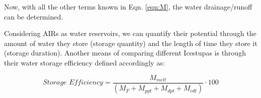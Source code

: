 \documentclass[utf8]{frontiersSCNS} %
\begin{document}
Now, with all the other terms known in Eqn. \ref{eqn:M}, the water drainage/runoff can be determined. 

Considering AIRs as water reservoirs, we can quantify their potential through the amount of water they store (storage
quantity) and the length of time they store it (storage duration). Another means of comparing different Icestupas is
through their water storage efficiency defined accordingly as:

\begin{equation} \textit{Storage Efficiency} = \frac{M_{melt}}{(M_F+M_{ppt}+M_{dpt}+M_{cdt})} \cdot 100 \end{equation}


% 
% 
\end{document}
